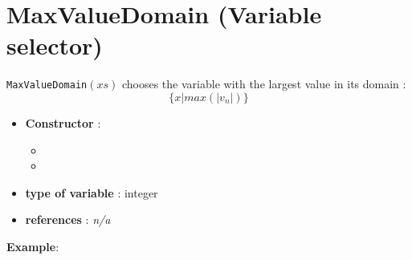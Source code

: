 \section{MaxValueDomain (Variable selector)}\label{maxvaldomain:maxvaldomainvarselector}\hypertarget{maxvaldomain:maxvaldomainvarselector}{}
\begin{notedef}
  \texttt{MaxValueDomain}$(xs)$ chooses the variable with the largest value in its domain :
$$\{x | max(|v_{n}|)\}$$
\end{notedef}

\begin{itemize}
	\item \textbf{Constructor} : 
	\begin{itemize}
	\item {}
	\item {}
	\end{itemize}	
	\item \textbf{type of variable} : integer
	\item \textbf{references} : \emph{n/a}
\end{itemize}

\textbf{Example}:
%

